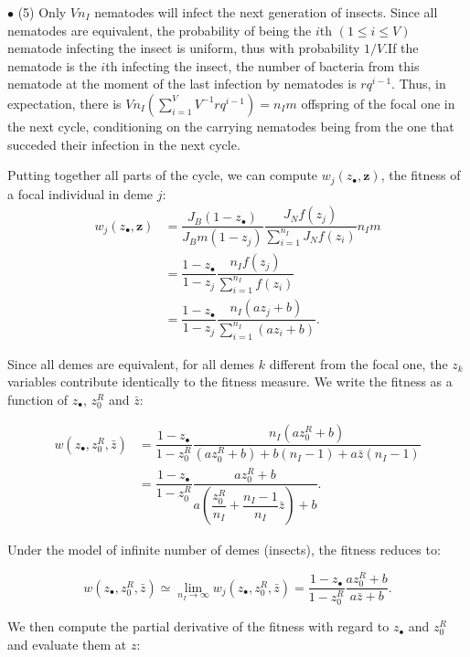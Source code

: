 \documentclass{article}
\begin{document}
 
 $\bullet$ (5) Only $V n_I$ nematodes will infect the next generation of insects. Since all nematodes are equivalent, the probability of being the $i$th $(1 \leq i \leq V)$ nematode infecting the insect 
is uniform, thus with probability $1/V$.If the nematode is the $i$th infecting the insect, the number of bacteria from this nematode at the moment of the last infection by nematodes is $r q^{i-1}$.
Thus, in expectation, there is $V n_I (\sum_{i=1}^V V^{-1}  r q^{i-1})=n_I m$ offspring of the focal one in the next cycle, conditioning on the carrying nematodes being from the one that succeded their infection in the next cycle. 


Putting together all parts of the cycle, we can compute $ w_j(z_\bullet , \mathbf{z} )$, the fitness of a focal individual in deme $j$:
 \begin{align}
 w_j(z_\bullet , \mathbf{z} ) &= \dfrac{J_B(1-z_\bullet)}{J_B m (1- z_j)}\dfrac{ J_N f(z_j)}{\sum_{i=1}^{n_I} J_N  f(z_i)} n_I m \\
 &= \dfrac{1-z_\bullet}{1- z_j}\dfrac{n_I f(z_j)}{\sum_{i=1}^{n_I} f(z_i)} \\
  &= \dfrac{1-z_\bullet}{1- z_j}\dfrac{n_I (a z_j +b) }{\sum_{i=1}^{n_I} (a z_i +b)}.
 \end{align}
 
 Since all demes are equivalent, for all demes $k$ different from the focal one, the $z_k$ variables contribute identically to the fitness measure. We write the fitness as a function of $z_\bullet$, $z_0^R$ and $\bar{z}$:
 
  \begin{align}
 w(z_\bullet ,z_0^R , \bar{z} ) &= \dfrac{1-z_\bullet}{1- z_0^R}\dfrac{n_I (a z_0^R +b) }{(a z_0^R +b)+ b(n_I -1) +a \bar{z} (n_I-1)} \\
 &= \dfrac{1-z_\bullet}{1- z_0^R}\dfrac{ a z_0^R +b }{a \left( \dfrac{z_0^R}{n_I} +\dfrac{n_I-1}{n_I} \bar{z} \right) +b}.
  \end{align}
  
  Under the model of infinite number of demes (insects), the fitness reduces to:
  
  \begin{equation}
  w(z_\bullet ,z_0^R , \bar{z} ) \simeq \lim_{n_I \rightarrow \infty} w_j(z_\bullet ,z_0^R , \bar{z} ) = \dfrac{1-z_\bullet}{1- z_0^R}\dfrac{a z_0^R +b }{a \bar{z} +b}.
  \end{equation}
  
  We then compute the partial derivative of the fitness with regard to $z_\bullet$ and $z_0^R$ and evaluate them at $z$:
  
\end{document}

